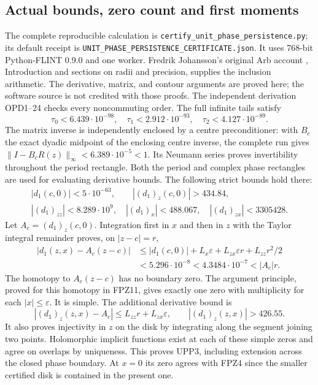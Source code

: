 \documentclass[11pt]{article}
\begin{document}
\subsection{Actual bounds, zero count and first moments}
The complete reproducible calculation is
\texttt{certify\_unit\_phase\_persistence.py}; its default receipt is
\texttt{UNIT\_PHASE\_PERSISTENCE\_CERTIFICATE.json}.
It uses 768-bit Python-FLINT 0.9.0 and one worker.
Fredrik Johansson's original Arb account \cite{human:arb2016},
Introduction and sections on radii and precision, supplies the
inclusion arithmetic. The derivative, matrix, and contour arguments
are proved here; the software source is not credited with those proofs.
The independent derivation OPD1--24 checks every noncommuting order.
The full infinite tails satisfy
\[
 \tau_0<6.439\cdot10^{-98},\quad
 \tau_1<2.912\cdot10^{-93},\quad
 \tau_2<4.127\cdot10^{-89}.
 \tag{UPP9}
\]
The matrix inverse is independently enclosed by a centre
preconditioner: with $B_c$ the exact dyadic midpoint of the
enclosing centre inverse, the complete run gives
$\|I-B_cR(z)\|_\infty<6.389\cdot10^{-5}<1$.
Its Neumann series proves invertibility throughout the period rectangle.
Both the period and complex phase rectangles are used for evaluating
derivative bounds. The following strict bounds hold there:
\[
 \begin{gathered}
 |d_1(c,0)|<5\cdot10^{-63},\qquad |(d_1)_z(c,0)|>434.84,\\
 |(d_1)_{zz}|<8.289\cdot10^9,\quad
 |(d_1)_x|<488.067,\quad |(d_1)_{zx}|<3305428.
 \end{gathered}\tag{UPP10}
\]
Let $A_c=(d_1)_z(c,0)$. Integration first in $x$ and then in $z$
with the Taylor integral remainder proves, on $|z-c|=r$,
\[
 \begin{aligned}
 |d_1(z,x)-A_c(z-c)|
 &\le |d_1(c,0)|+L_x\varepsilon
       +L_{zx}\varepsilon r+L_{zz}r^2/2\\
 &<5.296\cdot10^{-8}<4.3484\cdot10^{-7}<|A_c|r.
 \end{aligned}\tag{UPP11}
\]
The homotopy to $A_c(z-c)$ has no boundary zero. The argument
principle, proved for this homotopy in FPZ11, gives exactly one
zero with multiplicity for each $|x|\le\varepsilon$.
It is simple. The additional derivative bound is
\[
 |(d_1)_z(z,x)-A_c|\le L_{zz}r+L_{zx}\varepsilon,
 \qquad |(d_1)_z(z,x)|>426.55.
 \tag{UPP12}
\]
It also proves injectivity in $z$ on the disk by integrating along
the segment joining two points. Holomorphic implicit functions exist
at each of these simple zeros and agree on overlaps by uniqueness.
This proves UPP3, including extension across the closed phase boundary.
At $x=0$ its zero agrees with FPZ4 since the smaller certified disk
is contained in the present one.
\end{document}
